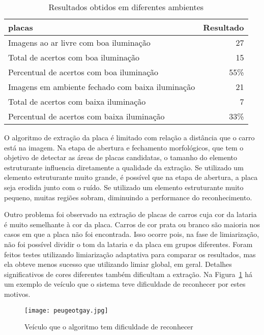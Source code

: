 \begin{table}[]
\centering
\caption{Resultados obtidos em diferentes ambientes}
\label{tab:resultados_ambientes}
\begin{tabular}{@{}lr@{}}
\toprule
placas                                      		& \multicolumn{1}{l}{Resultado} \\ \midrule
Imagens ao ar livre com boa iluminação     			& 27                            \\
Total de acertos com boa iluminação    			 	& 15                            \\
Percentual de acertos com boa iluminação    		 & 55\%                            \\
Imagens em ambiente fechado com baixa iluminação     & 21                            \\
Total de acertos com baixa iluminação    			 & 7                            \\
Percentual de acertos com baixa iluminação 			& 33\%
\end{tabular}
\end{table}

O algoritmo de extração da placa é limitado com relação a distância que o carro
está na imagem. Na etapa de abertura e fechamento morfológicos, que tem o
objetivo de detectar as áreas de placas candidatas, o tamanho do elemento
estruturante influencia diretamente a qualidade da extração. Se utilizado um
elemento estruturante muito grande, é possível que na etapa de abertura, a placa
seja erodida junto com o ruído. Se utilizado um elemento estruturante muito
pequeno, muitas regiões sobram, diminuindo a performance do reconhecimento.

Outro problema foi observado na extração de placas de carros cuja cor da lataria
é muito semelhante à cor da placa. Carros de cor prata ou branco são maioria nos casos
em que a placa não foi encontrada. Isso ocorre pois, na fase de limiarização, não foi 
possível dividir o tom da lataria e da placa em grupos diferentes. Foram feitos testes
utilizando limiarização adaptativa para comparar os resultados, mas ela obteve menos sucesso
que utilizando limiar global, em geral. Detalhes significativos de cores diferentes também dificultam
a extração. Na Figura~\ref{fig:peugeot_gay} há um exemplo de veículo que o sistema teve dificuldade
de reconhecer por estes motivos.

\begin{figure}[H]
	\centering
	\texttt{[image: peugeotgay.jpg]}
	\caption{Veículo que o algoritmo tem dificuldade de reconhecer}
	\label{fig:peugeot_gay}
\end{figure}

